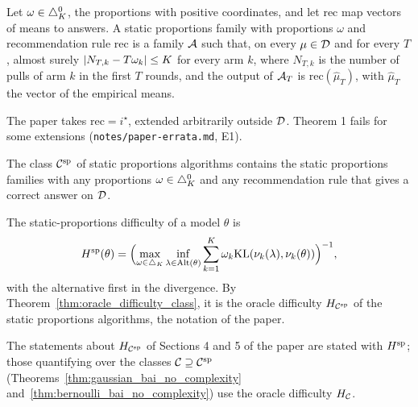 \begin{definition}
  \label{def:static_proportions}
  \leanok
  Let $\omega \in \triangle_K^0$, the proportions with positive coordinates, and let
  $\mathrm{rec}$ map vectors of means to answers. A static proportions family with proportions
  $\omega$ and recommendation rule $\mathrm{rec}$ is a family $\mathcal{A}$ such that, on every
  $\mu \in \mathcal{D}$ and for every $T$, almost surely $\lvert N_{T,k} - T \omega_k \rvert \le K$ for every arm
  $k$, where $N_{T,k}$ is the number of pulls of arm $k$ in the first $T$ rounds, and the output of
  $\mathcal{A}_T$ is $\mathrm{rec}(\hat\mu_T)$, with $\hat\mu_T$ the vector of the empirical means.
\end{definition}

The paper takes $\mathrm{rec} = i^{\star}$, extended arbitrarily outside $\mathcal{D}$. Theorem 1 fails for
some extensions (\texttt{notes/paper-errata.md}, E1).

\begin{definition}
  \label{def:static_class}
  \leanok
  The class $\mathcal{C}^{\mathrm{sp}}$ of static proportions algorithms contains the static proportions families with
  any proportions $\omega \in \triangle_K^0$ and any recommendation rule that gives a correct answer
  on $\mathcal{D}$.
\end{definition}

\begin{definition}
  \label{def:static_difficulty}
  \leanok
  The static-proportions difficulty of a model $\theta$ is
  \[ H^{\mathrm{sp}}(\theta) = \Bigl( \max_{\omega \in \triangle_K} \inf_{\lambda \in \mathrm{Alt}(\theta)}
    \sum_{k=1}^K \omega_k \mathrm{KL}(\nu_k(\lambda), \nu_k(\theta)) \Bigr)^{-1}, \]
  with the alternative first in the divergence. By Theorem~\ref{thm:oracle_difficulty_class}, it
  is the oracle difficulty $H_{\mathcal{C}^{\mathrm{sp}}}$ of the static proportions algorithms, the notation of the
  paper.
\end{definition}

The statements about $H_{\mathcal{C}^{\mathrm{sp}}}$ of Sections 4 and 5 of the paper are stated with $H^{\mathrm{sp}}$; those
quantifying over the classes $\mathcal{C} \supseteq \mathcal{C}^{\mathrm{sp}}$ (Theorems~\ref{thm:gaussian_bai_no_complexity}
and~\ref{thm:bernoulli_bai_no_complexity}) use the oracle difficulty $H_{\mathcal{C}}$.
